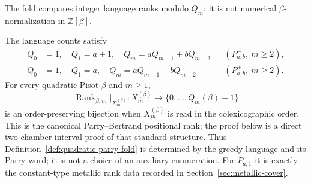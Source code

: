 The fold compares integer language ranks modulo $Q_m$; it is not numerical
$\beta$-normalization in $\mathbb Z[\beta]$.

\begin{proposition}
\label{prop:parry-rank-bijection}
The language counts satisfy
\begin{align}
Q_0&=1,\quad Q_1=a+1,\quad Q_m=aQ_{m-1}+bQ_{m-2}
&& (P^-_{a,b},\ m\ge2),\label{eq:qminus}\\
Q_0&=1,\quad Q_1=a,\quad Q_m=aQ_{m-1}-bQ_{m-2}
&& (P^+_{a,b},\ m\ge2).\label{eq:qplus}
\end{align}
For every quadratic Pisot $\beta$ and $m\ge1$,
\[
\operatorname{Rank}_{\beta,m}|_{X_m^{(\beta)}}:
X_m^{(\beta)}\longrightarrow\{0,\ldots,Q_m(\beta)-1\}
\]
is an order-preserving bijection when $X_m^{(\beta)}$ is read in the
colexicographic order.  This is the canonical Parry--Bertrand positional
rank; the proof below is a direct two-chamber interval proof of that standard
structure.  Thus Definition~\ref{def:quadratic-parry-fold} is
determined by the greedy language and its Parry word; it is not a choice of
an auxiliary enumeration.  For $P^-_{a,1}$ it is exactly the constant-type
metallic rank data recorded in Section~\ref{sec:metallic-cover}.
\end{proposition}

